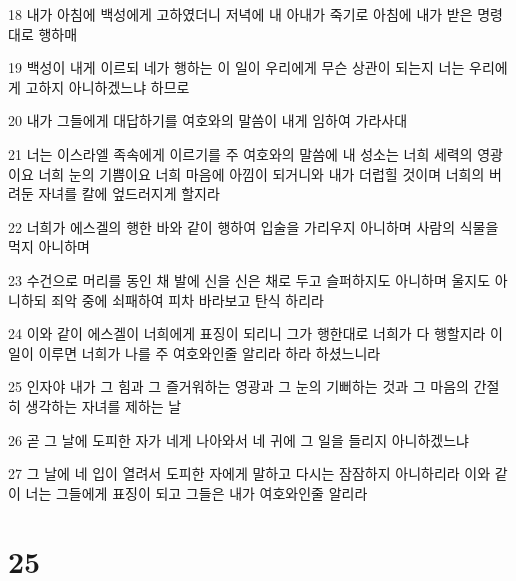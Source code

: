 \par 18 내가 아침에 백성에게 고하였더니 저녁에 내 아내가 죽기로 아침에 내가 받은 명령대로 행하매
\par 19 백성이 내게 이르되 네가 행하는 이 일이 우리에게 무슨 상관이 되는지 너는 우리에게 고하지 아니하겠느냐 하므로
\par 20 내가 그들에게 대답하기를 여호와의 말씀이 내게 임하여 가라사대
\par 21 너는 이스라엘 족속에게 이르기를 주 여호와의 말씀에 내 성소는 너희 세력의 영광이요 너희 눈의 기쁨이요 너희 마음에 아낌이 되거니와 내가 더럽힐 것이며 너희의 버려둔 자녀를 칼에 엎드러지게 할지라
\par 22 너희가 에스겔의 행한 바와 같이 행하여 입술을 가리우지 아니하며 사람의 식물을 먹지 아니하며
\par 23 수건으로 머리를 동인 채 발에 신을 신은 채로 두고 슬퍼하지도 아니하며 울지도 아니하되 죄악 중에 쇠패하여 피차 바라보고 탄식 하리라
\par 24 이와 같이 에스겔이 너희에게 표징이 되리니 그가 행한대로 너희가 다 행할지라 이 일이 이루면 너희가 나를 주 여호와인줄 알리라 하라 하셨느니라
\par 25 인자야 내가 그 힘과 그 즐거워하는 영광과 그 눈의 기뻐하는 것과 그 마음의 간절히 생각하는 자녀를 제하는 날
\par 26 곧 그 날에 도피한 자가 네게 나아와서 네 귀에 그 일을 들리지 아니하겠느냐
\par 27 그 날에 네 입이 열려서 도피한 자에게 말하고 다시는 잠잠하지 아니하리라 이와 같이 너는 그들에게 표징이 되고 그들은 내가 여호와인줄 알리라

\chapter{25}


